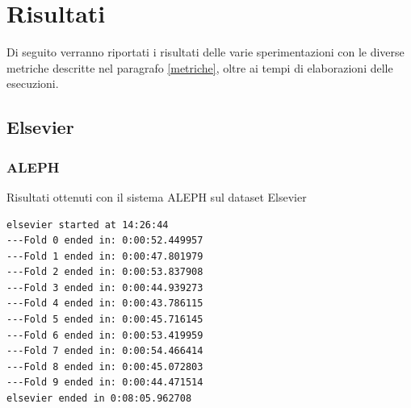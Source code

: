 \section{Risultati}
Di seguito verranno riportati i risultati delle varie sperimentazioni con le diverse metriche descritte nel paragrafo \ref{metriche}, oltre ai tempi di elaborazioni delle esecuzioni.
\subsection{Elsevier}
\subsubsection{ALEPH}
\begin{table}[h!tbp]
\caption[Risultati ALEPH-Elsevier]{Risultati ottenuti con il sistema ALEPH sul dataset Elsevier}
\label{tab:ris:aleph:elsevier}
\end{table}

\begin{verbatim}
elsevier started at 14:26:44
---Fold 0 ended in: 0:00:52.449957
---Fold 1 ended in: 0:00:47.801979
---Fold 2 ended in: 0:00:53.837908
---Fold 3 ended in: 0:00:44.939273
---Fold 4 ended in: 0:00:43.786115
---Fold 5 ended in: 0:00:45.716145
---Fold 6 ended in: 0:00:53.419959
---Fold 7 ended in: 0:00:54.466414
---Fold 8 ended in: 0:00:45.072803
---Fold 9 ended in: 0:00:44.471514
elsevier ended in 0:08:05.962708
\end{verbatim}

